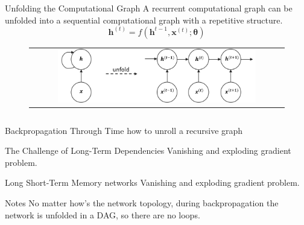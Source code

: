 \documentclass[aspectratio=169]{beamer}
\begin{document}

\begin{frame}{Unfolding the Computational Graph}
A recurrent computational graph can be unfolded into a sequential computational graph with a repetitive structure.
\begin{equation*}
\bm{h}^{(t)} = f(\bm{h}^{t-1}, \bm{x}^{(t)}; \bm{\theta})
\end{equation*}
\begin{figure}
\begin{tabular}{c}
\includegraphics[width=0.8\textwidth]{img/rnn/rnn_unfold.png}
\end{tabular}
\end{figure}
\begin{columns}
\end{columns}
\end{frame}


\begin{frame}{Backpropagation Through Time}
how to unroll a recursive graph
\end{frame}


\begin{frame}{The Challenge of Long-Term Dependencies}
Vanishing and exploding gradient problem.
\end{frame}


\begin{frame}{Long Short-Term Memory networks}
Vanishing and exploding gradient problem.
\end{frame}


\begin{frame}{Notes}
No matter how's the network topology, during backpropagation the network is unfolded in a DAG, so there are no loops.
\end{frame}
\end{document}
